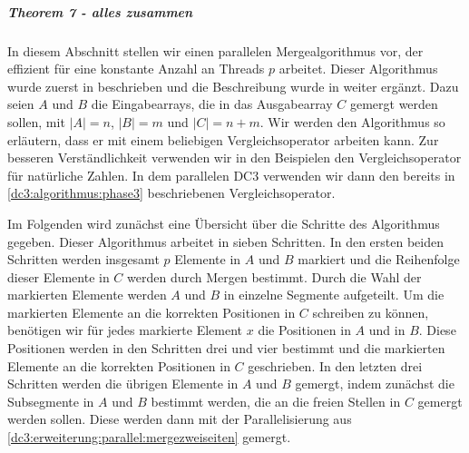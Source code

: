 \subparagraph*{Theorem 7 - alles zusammen}

In diesem Abschnitt stellen wir einen parallelen Mergealgorithmus vor, der effizient für eine konstante Anzahl an Threads $p$ arbeitet. Dieser Algorithmus wurde zuerst in \cite{merge:valiant} beschrieben und die Beschreibung wurde in \cite{merge:kruskal} weiter ergänzt. Dazu seien $A$ und $B$ die Eingabearrays, die in das Ausgabearray $C$ gemergt werden sollen, mit $|A|=n$, $|B|=m$ und $|C|=n+m$.
Wir werden den Algorithmus so erläutern, dass er mit einem beliebigen Vergleichsoperator arbeiten kann. Zur besseren Verständlichkeit verwenden wir in den Beispielen den Vergleichsoperator für natürliche Zahlen. In dem parallelen DC3 verwenden wir dann den bereits in \cref{dc3:algorithmus:phase3} beschriebenen Vergleichsoperator. 

Im Folgenden wird zunächst eine Übersicht über die Schritte des Algorithmus gegeben. Dieser Algorithmus arbeitet in sieben Schritten. In den ersten beiden Schritten werden insgesamt $p$ Elemente in $A$ und $B$ markiert und die Reihenfolge dieser Elemente in $C$ werden durch Mergen bestimmt. Durch die Wahl der markierten Elemente werden $A$ und $B$ in einzelne Segmente aufgeteilt. Um die markierten Elemente an die korrekten Positionen in $C$ schreiben zu können, benötigen wir für jedes markierte Element $x$ die Positionen in $A$ und in $B$. Diese Positionen werden in den Schritten drei und vier bestimmt und die markierten Elemente an die korrekten Positionen in $C$ geschrieben.
In den letzten drei Schritten werden die übrigen Elemente in $A$ und $B$ gemergt, indem zunächst die Subsegmente in $A$ und $B$ bestimmt werden, die an die freien Stellen in $C$ gemergt werden sollen. Diese werden dann mit der Parallelisierung aus \cref{dc3:erweiterung:parallel:mergezweiseiten} gemergt.

